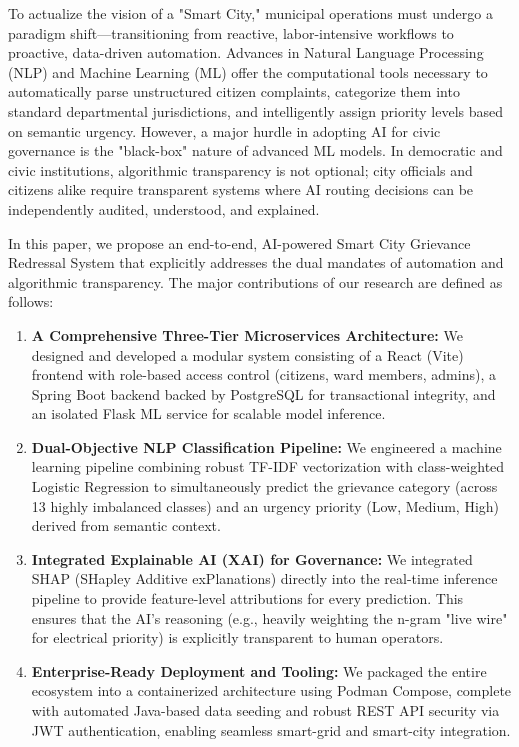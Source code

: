 \documentclass[conference]{IEEEtran}
\begin{document}
To actualize the vision of a "Smart City," municipal operations must undergo a paradigm shift—transitioning from reactive, labor-intensive workflows to proactive, data-driven automation. Advances in Natural Language Processing (NLP) and Machine Learning (ML) offer the computational tools necessary to automatically parse unstructured citizen complaints, categorize them into standard departmental jurisdictions, and intelligently assign priority levels based on semantic urgency. However, a major hurdle in adopting AI for civic governance is the "black-box" nature of advanced ML models. In democratic and civic institutions, algorithmic transparency is not optional; city officials and citizens alike require transparent systems where AI routing decisions can be independently audited, understood, and explained.

In this paper, we propose an end-to-end, AI-powered Smart City Grievance Redressal System that explicitly addresses the dual mandates of automation and algorithmic transparency. The major contributions of our research are defined as follows:

\begin{enumerate}
  \item \textbf{A Comprehensive Three-Tier Microservices Architecture:} We designed and developed a modular system consisting of a React (Vite) frontend with role-based access control (citizens, ward members, admins), a Spring Boot backend backed by PostgreSQL for transactional integrity, and an isolated Flask ML service for scalable model inference.
  \item \textbf{Dual-Objective NLP Classification Pipeline:} We engineered a machine learning pipeline combining robust TF-IDF vectorization with class-weighted Logistic Regression to simultaneously predict the grievance category (across 13 highly imbalanced classes) and an urgency priority (Low, Medium, High) derived from semantic context.
  \item \textbf{Integrated Explainable AI (XAI) for Governance:} We integrated SHAP (SHapley Additive exPlanations) directly into the real-time inference pipeline to provide feature-level attributions for every prediction. This ensures that the AI's reasoning (e.g., heavily weighting the n-gram "live wire" for electrical priority) is explicitly transparent to human operators.
  \item \textbf{Enterprise-Ready Deployment and Tooling:} We packaged the entire ecosystem into a containerized architecture using Podman Compose, complete with automated Java-based data seeding and robust REST API security via JWT authentication, enabling seamless smart-grid and smart-city integration.
\end{enumerate}
\end{document}
